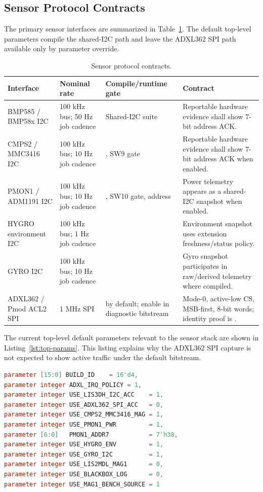 \documentclass[11pt]{article}
\newcommand{\sig}[1]{\texttt{\detokenize{#1}}}
\newcommand{\param}[1]{\texttt{\detokenize{#1}}}
\begin{document}
\subsection{Sensor Protocol Contracts}

The primary sensor interfaces are summarized in Table~\ref{tab:protocols}.  The
default top-level parameters compile the shared-I2C path and leave the ADXL362
SPI path available only by parameter override.

\begin{table}[htbp]
\centering
\caption{Sensor protocol contracts.}
\label{tab:protocols}
\small
\begin{tabularx}{\textwidth}{@{}p{}p{}p{}X@{}}
\toprule
Interface & Nominal rate & Compile/runtime gate & Contract \\
\midrule
BMP585 / BMP58x I2C & 100 kHz bus; 50 Hz job cadence & Shared-I2C suite & Reportable hardware evidence shall show 7-bit address \sig{0x47} ACK. \\
CMPS2 / MMC3416 I2C & 100 kHz bus; 10 Hz job cadence & \param{USE_CMPS2_MMC3416_MAG=1}, SW9 gate & Reportable hardware evidence shall show 7-bit address \sig{0x30} ACK when enabled. \\
PMON1 / ADM1191 I2C & 100 kHz bus; 10 Hz job cadence & \param{USE_PMON1_PWR=1}, SW10 gate, address \sig{0x38} & Power telemetry appears as a shared-I2C snapshot when enabled. \\
HYGRO environment I2C & 100 kHz bus; 1 Hz job cadence & \param{USE_HYGRO_ENV=1} & Environment snapshot uses extension freshness/status policy. \\
GYRO I2C & 100 kHz bus; 10 Hz job cadence & \param{USE_GYRO_I2C=1} & Gyro snapshot participates in raw/derived telemetry where compiled. \\
ADXL362 / Pmod ACL2 SPI & 1 MHz SPI & \param{USE_ADXL362_SPI_ACC=0} by default; enable in diagnostic bitstream & Mode-0, active-low CS, MSB-first, 8-bit words; identity proof is \sig{PARTID=0xF2}. \\
\bottomrule
\end{tabularx}
\end{table}

The current top-level default parameters relevant to the sensor stack are shown
in Listing~\ref{lst:top-params}.  This listing explains why the ADXL362 SPI
capture is not expected to show active traffic under the default bitstream.

\begin{lstlisting}[language=Verilog,caption={Default top-level sensor parameters.},label={lst:top-params}]
parameter [15:0] BUILD_ID    = 16'd4,
parameter integer ADXL_IRQ_POLICY = 1,
parameter integer USE_LIS3DH_I2C_ACC    = 1,
parameter integer USE_ADXL362_SPI_ACC   = 0,
parameter integer USE_CMPS2_MMC3416_MAG = 1,
parameter integer USE_PMON1_PWR         = 1,
parameter [6:0]   PMON1_ADDR7           = 7'h38,
parameter integer USE_HYGRO_ENV         = 1,
parameter integer USE_GYRO_I2C          = 1,
parameter integer USE_LIS2MDL_MAG1      = 0,
parameter integer USE_BLACKBOX_LOG      = 0,
parameter integer USE_MAG1_BENCH_SOURCE = 1
\end{lstlisting}
\end{document}

